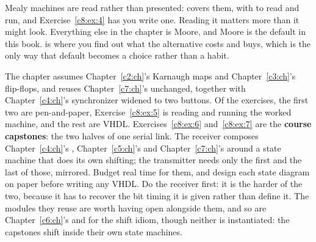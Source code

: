 Mealy machines are read rather than presented:  covers them, with
 to read and run, and Exercise~\ref{c8:ex:4} has you write one. Reading it
matters more than it might look. Everything else in the chapter is Moore, and Moore is the default
in this book.  is where you find out what the alternative costs and buys, which is the
only way that default becomes a choice rather than a habit.

The chapter assumes Chapter~\ref{c2:ch}'s Karnaugh maps and Chapter~\ref{c3:ch}'s flip-flops, and
reuses Chapter~\ref{c7:ch}'s  unchanged, together with Chapter~\ref{c4:ch}'s
synchronizer widened to two buttons. Of the exercises, the first two are pen-and-paper,
Exercise~\ref{c8:ex:5} is reading and running the worked machine, and the rest are VHDL.
Exercises~\ref{c8:ex:6} and~\ref{c8:ex:7} are the \textbf{course capstones}: the two halves of one
serial link. The receiver composes Chapter~\ref{c4:ch}'s ,
Chapter~\ref{c5:ch}'s  and Chapter~\ref{c7:ch}'s  around a state machine
that does its own shifting; the transmitter needs only the first and the last of those, mirrored.
Budget real time for them, and design each state diagram on paper before writing any VHDL. Do the
receiver first: it is the harder of the two, because it has to recover the bit timing it is given
rather than define it. The modules they reuse are worth having open alongside them, and so are
Chapter~\ref{c6:ch}'s  and  for the shift idiom, though neither is
instantiated: the capstones shift inside their own state machines.





